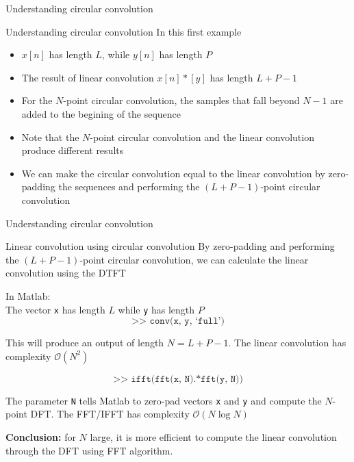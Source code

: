 \documentclass[10pt]{beamer}
\begin{document}
%
\begin{frame}{Understanding circular convolution}
	\begin{center}
		\resizebox{0.65\textwidth}{!}{}
	\end{center}
\end{frame}

\begin{frame}{Understanding circular convolution}
In this first example
\begin{itemize}
	\item $x[n]$ has length $L$, while $y[n]$ has length $P$
	\item The result of linear convolution $x[n]\ast [y]$ has length $L+P-1$
	\item For the $N$-point circular convolution, the {\color{blue2} samples that fall beyond $N-1$} are added to the begining of the sequence
	\item Note that the $N$-point circular convolution and the linear convolution produce different results
	\item We can make the circular convolution equal to the linear convolution by zero-padding the sequences and performing the $(L+P-1)$-point circular convolution
\end{itemize}
\end{frame}

%
\begin{frame}{Understanding circular convolution}
\begin{center}
	\resizebox{0.65\textwidth}{!}{}
\end{center}
\end{frame}

\begin{frame}{Linear convolution using circular convolution}
By zero-padding and performing the $(L+P-1)$-point circular convolution, we can calculate the linear convolution using the DTFT

\vspace{0.25cm}
In Matlab:\\
The vector \texttt{x} has length $L$ while \texttt{y} has length $P$
\begin{equation*}
	\texttt{>> conv(x, y, `full')} \tag{linear convolution}
\end{equation*}

This will produce an output of length $N = L+P-1$. The linear convolution has complexity $\mathcal{O}(N^2)$

\begin{equation*}
\texttt{>> ifft(fft(x, N).*fft(y, N))} \tag{circular convolution}
\end{equation*}

The parameter \texttt{N} tells Matlab to zero-pad vectors \texttt{x} and \texttt{y}  and compute the $N$-point DFT. The FFT/IFFT has complexity $\mathcal{O}(N\log N)$

\vspace{0.25cm}
\textbf{Conclusion:} for $N$ large, it is more efficient to compute the linear convolution through the DFT using FFT algorithm.
\end{frame}
\end{document}
